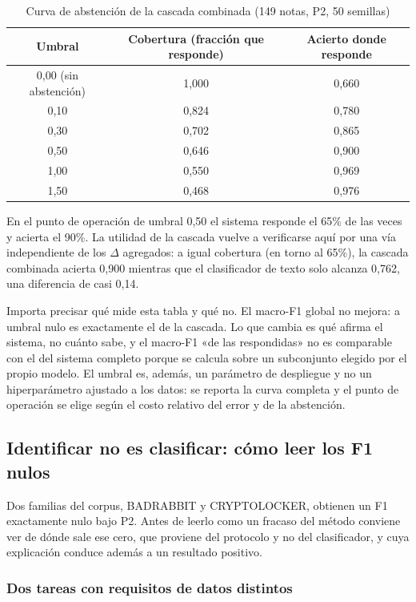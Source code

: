 \begin{table}[ht]
\centering
\caption{Curva de abstención de la cascada combinada (149 notas, P2, 50 semillas)}
\label{tab:abstencion}
\begin{tabular}{|c|c|c|}
\hline
\textbf{Umbral} & \textbf{Cobertura (fracción que responde)} & \textbf{Acierto donde responde} \\
\hline
0,00 (sin abstención) & 1,000 & 0,660 \\
0,10 & 0,824 & 0,780 \\
0,30 & 0,702 & 0,865 \\
0,50 & 0,646 & 0,900 \\
1,00 & 0,550 & 0,969 \\
1,50 & 0,468 & 0,976 \\
\hline
\end{tabular}
\end{table}

En el punto de operación de umbral 0,50 el sistema responde el 65\% de las veces y acierta el 90\%. La utilidad de la cascada vuelve a verificarse aquí por una vía independiente de los $\Delta$ agregados: a igual cobertura (en torno al 65\%), la cascada combinada acierta 0,900 mientras que el clasificador de texto solo alcanza 0,762, una diferencia de casi 0,14.

Importa precisar qué mide esta tabla y qué no. El macro-F1 global no mejora: a umbral nulo es exactamente el de la cascada. Lo que cambia es qué afirma el sistema, no cuánto sabe, y el macro-F1 «de las respondidas» no es comparable con el del sistema completo porque se calcula sobre un subconjunto elegido por el propio modelo. El umbral es, además, un parámetro de despliegue y no un hiperparámetro ajustado a los datos: se reporta la curva completa y el punto de operación se elige según el costo relativo del error y de la abstención.

\subsection{Identificar no es clasificar: cómo leer los F1 nulos}
\label{subsec:res_ceros}

Dos familias del corpus, BADRABBIT y CRYPTOLOCKER, obtienen un F1 exactamente nulo bajo P2. Antes de leerlo como un fracaso del método conviene ver de dónde sale ese cero, que proviene del protocolo y no del clasificador, y cuya explicación conduce además a un resultado positivo.

\subsubsection*{Dos tareas con requisitos de datos distintos}

